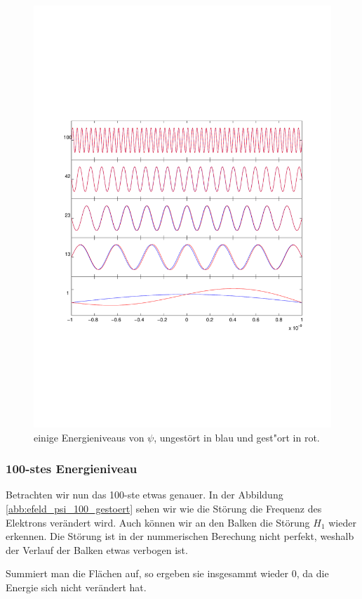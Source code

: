 \begin{refsection}
\begin{figure}
 \centering
 \includegraphics[width=12cm,clip=true,trim=2cm 7cm 1cm 8cm]{efeld/Psi_SubPlots_gestoert.pdf}
 \caption{einige Energieniveaus von $\psi$, ungest\"ort in blau und gest"ort in rot.}
 \label{abb:efeld_psi_gestoert}
\end{figure}

\subsubsection{100-stes Energieniveau}
Betrachten wir nun das 100-ste etwas genauer.
In der Abbildung \ref{abb:efeld_psi_100_gestoert} sehen wir wie die St\"orung die Frequenz des Elektrons ver\"andert wird.
Auch k\"onnen wir an den Balken die St\"orung $H_1$ wieder erkennen. 
Die St\"orung ist in der nummerischen Berechung nicht perfekt, weshalb der Verlauf der Balken etwas verbogen ist.

Summiert man die Fl\"achen auf, so ergeben sie insgesammt wieder $0$, da die Energie sich nicht ver\"andert hat.



\end{refsection}
